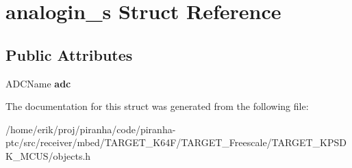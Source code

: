 \hypertarget{structanalogin__s}{}\section{analogin\+\_\+s Struct Reference}
\label{structanalogin__s}
\subsection*{Public Attributes}
\begin{DoxyCompactItemize}
\item 
A\+D\+C\+Name {\bfseries adc}\hypertarget{structanalogin__s_a9c7c4db18ddcb6e6ab6f388fbf5ecf20}{}\label{structanalogin__s_a9c7c4db18ddcb6e6ab6f388fbf5ecf20}

\end{DoxyCompactItemize}


The documentation for this struct was generated from the following file\+:\begin{DoxyCompactItemize}
\item 
/home/erik/proj/piranha/code/piranha-\/ptc/src/receiver/mbed/\+T\+A\+R\+G\+E\+T\+\_\+\+K64\+F/\+T\+A\+R\+G\+E\+T\+\_\+\+Freescale/\+T\+A\+R\+G\+E\+T\+\_\+\+K\+P\+S\+D\+K\+\_\+\+M\+C\+U\+S/objects.\+h\end{DoxyCompactItemize}
